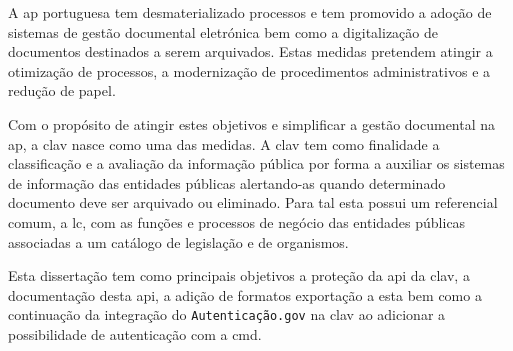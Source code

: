 A \acrlong{ap} portuguesa tem desmaterializado processos e tem promovido a adoção de sistemas de gestão documental eletrónica bem como a digitalização de documentos destinados a serem arquivados. Estas medidas pretendem atingir a otimização de processos, a modernização de procedimentos administrativos e a redução de papel.

Com o propósito de atingir estes objetivos e simplificar a gestão documental na \acrlong{ap}, a \acrfull{clav} nasce como uma das medidas. A \acrshort{clav} tem como finalidade a classificação e a avaliação da informação pública por forma a auxiliar os sistemas de informação das entidades públicas alertando-as quando determinado documento deve ser arquivado ou eliminado. Para tal esta possui um referencial comum, a \acrlong{lc}, com as funções e processos de negócio das entidades públicas associadas a um catálogo de legislação e de organismos.

Esta dissertação tem como principais objetivos a proteção da \acrshort{api} da \acrshort{clav}, a documentação desta \acrshort{api}, a adição de formatos exportação a esta bem como a continuação da integração do \texttt{Autenticação.gov} na \acrshort{clav} ao adicionar a possibilidade de autenticação com a \acrlong{cmd}.
